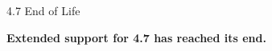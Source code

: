 
\begin{frame}[fragile]{4.7 End of Life}
\vspace{1.5cm}
\begin{center}
   \textbf{Extended support for 4.7 has reached its end.}
\end{center}
\end{frame}





%



